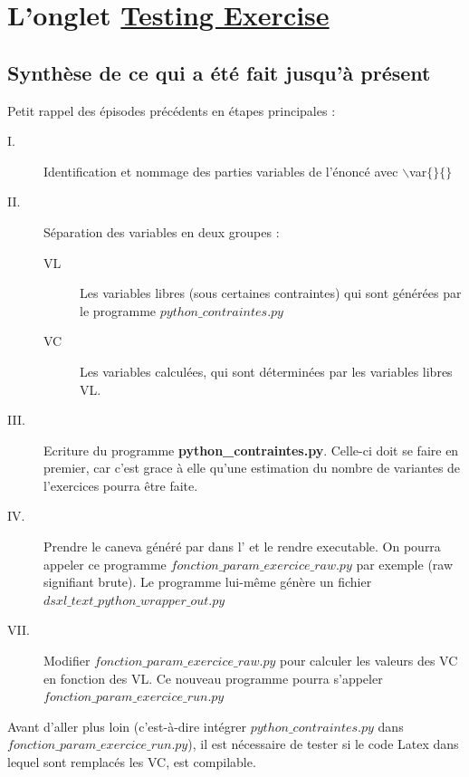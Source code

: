 {\begin{remarque}
\end{remarque}


\section{L'onglet \underline{Testing Exercise}}

\subsection{Synthèse de ce qui a été fait jusqu'à présent}

Petit rappel des épisodes précédents en étapes principales : 
\begin{description}
 \item[I. ]Identification et nommage des parties variables de l'énoncé avec $\backslash$var$\{\}\{\}$ 
 \item[II. ] Séparation des variables en deux groupes : 
 \begin{description}
  \item[VL] Les variables libres (sous certaines contraintes) qui sont générées par le programme  {\bf $python\_contraintes.py$}
  \item[VC] Les variables calculées, qui sont déterminées par les variables libres VL.
 \end{description}
 \item[III. ] Ecriture du programme  {\bf python\_contraintes.py}. Celle-ci doit se faire en premier, car c'est grace à elle 
    qu'une estimation du nombre de variantes de l'exercices pourra être faite. 
 \item[IV. ] Prendre le caneva généré par  dans l' et le rendre executable.
  On pourra appeler ce programme {\bf $fonction\_param\_exercice\_raw.py$} par exemple (raw signifiant brute).
  Le programme lui-même génère un fichier {\bf $dsxl\_text\_python\_wrapper\_out.py$}
 \item[VII. ] Modifier  {\bf $fonction\_param\_exercice\_raw.py$} pour calculer les valeurs des VC en fonction des VL. 
   Ce nouveau programme pourra s'appeler {\bf $fonction\_param\_exercice\_run.py$}
\end{description}

Avant d'aller plus loin (c'est-à-dire intégrer {\bf $python\_contraintes.py$} dans  {\bf $fonction\_param\_exercice\_run.py$}), il est nécessaire de tester si le code 
Latex dans lequel sont remplacés les VC, est compilable. 

}
